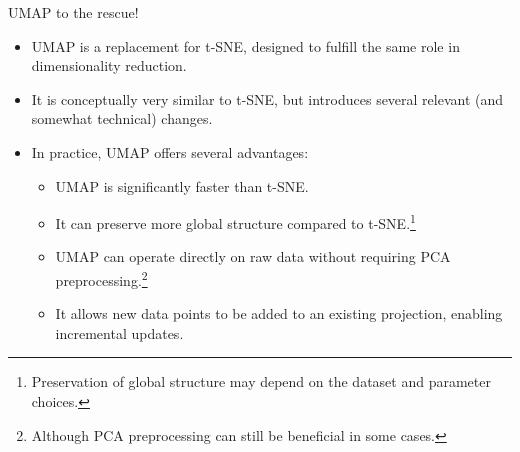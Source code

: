 \begin{frame}[allowframebreaks]{UMAP to the rescue!}
    \begin{itemize}
        \item UMAP is a replacement for t-SNE, designed to fulfill the same role in dimensionality reduction.
        \item It is conceptually very similar to t-SNE, but introduces several relevant (and somewhat technical) changes.
        \item In practice, UMAP offers several advantages:
        \begin{itemize}
            \item UMAP is significantly faster than t-SNE.
            \item It can preserve more global structure compared to t-SNE.\footnote{Preservation of global structure may depend on the dataset and parameter choices.}
            \item UMAP can operate directly on raw data without requiring PCA preprocessing.\footnote{Although PCA preprocessing can still be beneficial in some cases.}
            \item It allows new data points to be added to an existing projection, enabling incremental updates.
        \end{itemize}
    \end{itemize}
    \vspace{1em}
\end{frame}



